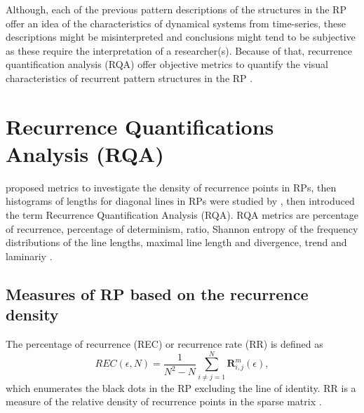 Although, each of the previous pattern descriptions of the structures in the 
RP offer an idea of the characteristics of dynamical systems from 
time-series, these descriptions might be misinterpreted and conclusions might 
tend to be subjective as these require the interpretation of a researcher(s).
Because of that, recurrence quantification analysis (RQA) offer objective
metrics to quantify the visual characteristics of recurrent 
pattern structures in the RP \citep{zbilut1992}.


\section{Recurrence Quantifications Analysis (RQA)}
\cite{zbilut1992} proposed metrics to investigate the density of recurrence 
points in RPs, then histograms of lengths for diagonal lines in RPs were 
studied by \cite{trulla1996}, then \cite{marwan2008} introduced the term 
Recurrence Quantification Analysis (RQA). RQA metrics are percentage 
of recurrence, percentage of determinism, ratio, Shannon entropy of the 
frequency distributions of the line lengths, maximal line length and 
divergence, trend and laminariy \citep{marwan2007, marwan2015}.


\subsection{Measures of RP based on the recurrence density}
The percentage of recurrence (REC) or recurrence rate (RR) is defined as
\begin{equation}
	REC(\epsilon,N)= 
	\frac{1}{N^2 - N} \sum^{N}_{i \neq j = 1} 
	\mathbf{R}^{m}_{i,j}(\epsilon),
\end{equation}
which enumerates the black dots in the RP excluding the line of identity.
RR is a measure of the relative density of recurrence points in the sparse 
matrix \citep{marwan2015}.


